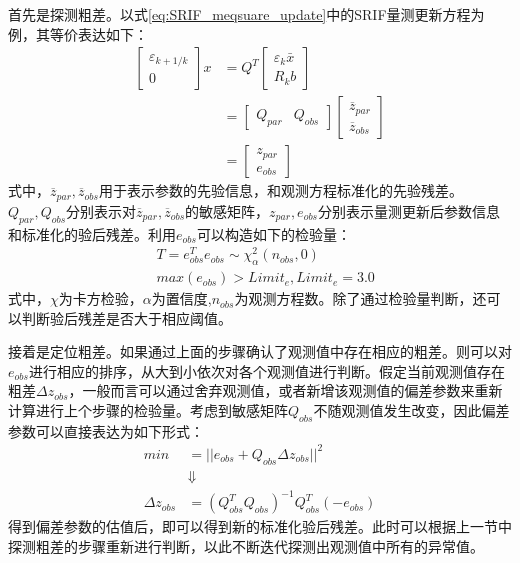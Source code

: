 首先是探测粗差。以式\eqref{eq:SRIF_meqsuare_update}中的SRIF量测更新方程为例，其等价表达如下：
\begin{equation}
	\begin{aligned}
		\begin{bmatrix}
			\varepsilon_{k+1/k} \\
			0
		\end{bmatrix} x&=Q^{T}
		\begin{bmatrix}
			\varepsilon_{k}\bar{x} \\
			R_{k}b 
		\end{bmatrix}\\
		& = \begin{bmatrix}
			Q_{par} &  Q_{obs}
		\end{bmatrix}	
		\begin{bmatrix}
			\overline{z}_{par} \\
			\overline{z}_{obs}
		\end{bmatrix}\\
		& =  \begin{bmatrix}
			z_{par} \\	
			e_{obs}
		\end{bmatrix}	
	\end{aligned}
\end{equation}
式中，\(\overline{z}_{par},\overline{z}_{obs}\)用于表示参数的先验信息，和观测方程标准化的先验残差。\(Q_{par},Q_{obs}\)分别表示对\(\overline{z}_{par},\overline{z}_{obs}\)的敏感矩阵，\(z_{par},e_{obs}\)分别表示量测更新后参数信息和标准化的验后残差。利用\(e_{obs}\)可以构造如下的检验量：
\begin{equation}
	\begin{aligned}
		& T= e_{obs}^{T}e_{obs} \sim \chi_{\alpha}^{2}(n_{obs},0) \\
		&max(e_{obs}) > Limit_{e},Limit_{e}=3.0
	\end{aligned}
\end{equation}
式中，\(\chi\)为卡方检验，\(\alpha\)为置信度,\(n_{obs}\)为观测方程数。除了通过检验量判断，还可以判断验后残差是否大于相应阈值。

接着是定位粗差。如果通过上面的步骤确认了观测值中存在相应的粗差。则可以对\(e_{obs}\)进行相应的排序，从大到小依次对各个观测值进行判断。假定当前观测值存在粗差\(\Delta z_{obs}\)，一般而言可以通过舍弃观测值，或者新增该观测值的偏差参数来重新计算进行上个步骤的检验量。考虑到敏感矩阵\(Q_{obs}\)不随观测值发生改变，因此偏差参数可以直接表达为如下形式：
\begin{equation}
	\begin{aligned}
		 min & =||e_{obs}+Q_{obs}\Delta z_{obs}||^{2}\\
		& \Downarrow \\
		 \Delta z_{obs} & =(Q_{obs}^{T}Q_{obs})^{-1}Q_{obs}^{T}(-e_{obs})
	\end{aligned}	
	\label{eq:get_DeltaZ}
\end{equation}
得到偏差参数的估值后，即可以得到新的标准化验后残差。此时可以根据上一节中探测粗差的步骤重新进行判断，以此不断迭代探测出观测值中所有的异常值。


